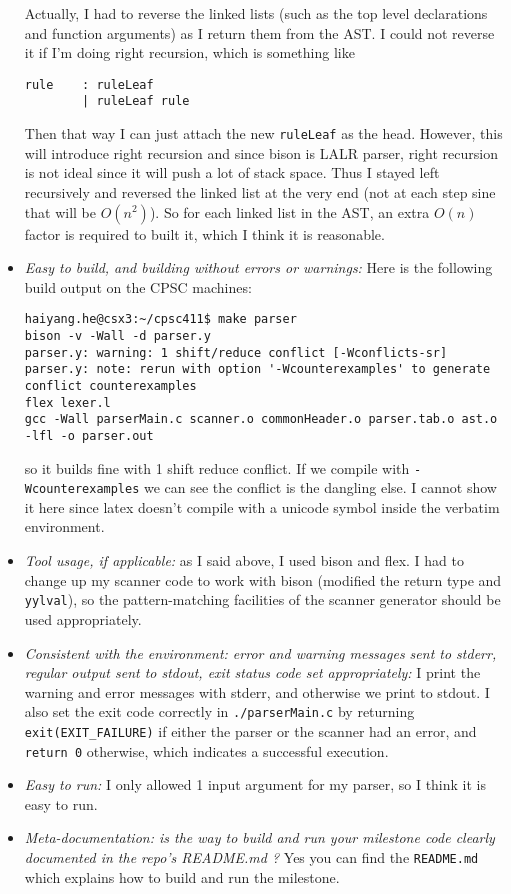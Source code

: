 \documentclass{article}
\begin{document}
\begin{itemize}
        Actually, I had to reverse the linked lists (such as the top level declarations and function arguments) as I return them from the AST. I could not reverse it if I'm doing right recursion, which is something like
        \begin{verbatim}
rule    : ruleLeaf
        | ruleLeaf rule 
        \end{verbatim}
        Then that way I can just attach the new \verb|ruleLeaf| as the head. However, this will introduce right recursion and since bison is LALR parser, right recursion is not ideal since it will push a lot of stack space. Thus I stayed left recursively and reversed the linked list at the very end (not at each step sine that will be $O(n^2)$). So for each linked list in the AST, an extra $O(n)$ factor is required to built it, which I think it is reasonable.

    \item \emph{Easy to build, and building without errors or warnings:}
        Here is the following build output on the CPSC machines:
        \begin{verbatim}
haiyang.he@csx3:~/cpsc411$ make parser
bison -v -Wall -d parser.y
parser.y: warning: 1 shift/reduce conflict [-Wconflicts-sr]
parser.y: note: rerun with option '-Wcounterexamples' to generate conflict counterexamples
flex lexer.l
gcc -Wall parserMain.c scanner.o commonHeader.o parser.tab.o ast.o -lfl -o parser.out
        \end{verbatim}
        so it builds fine with 1 shift reduce conflict. If we compile with \verb|-Wcounterexamples| we can see the conflict is the dangling else. I cannot show it here since latex doesn't compile with a unicode symbol inside the verbatim environment.

    \item \emph{Tool usage, if applicable: } as I said above, I used bison and flex. I had to change up my scanner code to work with bison (modified the return type and \verb|yylval|), so the pattern-matching facilities of the scanner generator should be used appropriately.

    \item \emph{Consistent with the environment: error and warning messages sent to stderr, regular output sent to stdout, exit status code set appropriately:} 
        I print the warning and error messages with stderr, and otherwise we print to stdout. I also set the exit code correctly in \verb|./parserMain.c| by returning \verb|exit(EXIT_FAILURE)| if either the parser or the scanner had an error, and \verb|return 0| otherwise, which indicates a successful execution.

    \item \emph{Easy to run:} I only allowed 1 input argument for my parser, so I think it is easy to run.

    \item \emph{Meta-documentation: is the way to build and run your milestone code clearly documented in the repo's README.md ? }
        Yes you can find the \verb|README.md| which explains how to build and run the milestone.

\end{itemize}
\end{document}
